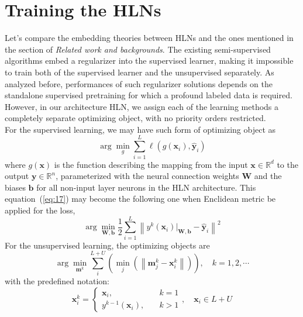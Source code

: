 \documentclass[3p,times,procedia]{elsarticle}
\begin{document}
\section{Training the HLNs}
Let's compare the embedding theories between
HLNs and the ones mentioned in the section of
\emph{Related work and backgrounds}.
The existing semi-supervised algorithms
embed a regularizer into the supervised 
learner, making it impossible to train both of
the supervised learner and the unsupervised
separately. As analyzed before, performances
of such regularizer solutions depends on the
standalone supervised pretraining for which
a profound labeled data is required.
However, in our architecture HLN, we assign
each of the learning methods a completely
separate optimizing object, with no priority
orders restricted.\\
For the supervised learning, we may have such
form of optimizing object as
\begin{equation}
	\arg \min_g \sum_{i=1}^L\ell\left(
	g(\mathbf{x}_i),
	\mathbf{\hat{y}}_i
	\right)
	\label{eq:17}
\end{equation}
where $g(\mathbf{x})$ is the function describing
the mapping from the input 
$\mathbf{x}\in\mathbb{R}^d$ to the output
$\mathbf{y}\in\mathbb{R}^n$, parameterized with
the neural connection weights $\mathbf{W}$ and 
the biases $\mathbf{b}$ for all non-input 
layer neurons in the HLN architecture.
This equation~(\ref{eq:17}) may become the 
following one when Enclidean metric be 
applied for the loss,
\begin{equation}
	\arg \min_{\mathbf{W},\mathbf{b}}
	\frac{1}{2}
	\sum_{i=1}^L
	\left\|
	y^k(
	\mathbf{x}_i)\big|_{\mathbf{W},\mathbf{b}}-
	\mathbf{\hat{y}}_i
	\right\|^2
	\label{eq:18}
\end{equation}
For the unsupervised learning, the optimizing
objects are
\begin{equation}
	\arg \min_{\mathbf{m}^k}
	\sum_i^{L+U}
	\left(
	\min_j\left(
	\left\|
	\mathbf{m}^k_j-\mathbf{x}^k_i
	\right\|
	\right)
	\right),\quad k=1,2,\cdots
	\label{eq:19}
\end{equation}
with the predefined notation:
\begin{equation}
	\mathbf{x}_i^k=
	\left\{
		\begin{aligned}
			\mathbf{x}_i,\quad & k=1\\
			y^{k-1}(\mathbf{x}_i),\quad & k>1
		\end{aligned}
	\right.
	,\quad \mathbf{x}_i\in L+U
	\label{eq:20}
\end{equation}
\end{document}

